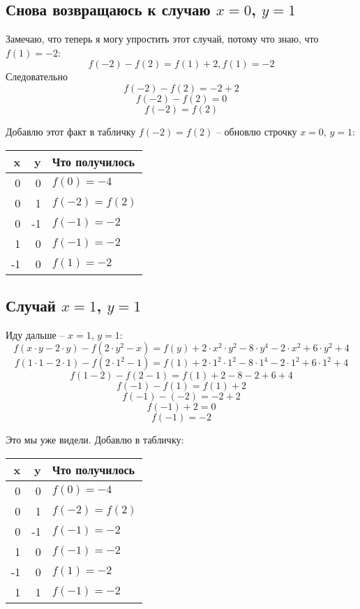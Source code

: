 \documentclass{article}
\begin{document}
\subsection{Снова возвращаюсь к случаю $x=0$, $y=1$}
Замечаю, что теперь я могу упростить этот случай, потому что знаю, что $f(1)=-2$:
$$f(-2)-f(2)=f(1)+2, f(1)=-2$$
Следовательно
$$f(-2)-f(2)=-2+2$$
$$f(-2)-f(2)=0$$
$$f(-2)=f(2)$$

\begin{samepage}
Добавлю этот факт в табличку {\boldmath\color{red}$f(-2)=f(2)$} -- обновлю строчку $x=0$, $y=1$:
\begin{center}
 \begin{tabular}{r r l} 
 \hline
 x & y & Что получилось        \\
 \hline
  0 &  0 & $f(0)=-4$           \\
  0 &  1 & $f(-2)=f(2)$        \\
  0 & -1 & $f(-1)=-2$          \\
  1 &  0 & $f(-1)=-2$          \\
 -1 &  0 & $f(1)=-2$ \\
 \hline
 \end{tabular}
\end{center}
\end{samepage}

\subsection{Случай $x=1$, $y=1$}
Иду дальше -- $x=1$, $y=1$:
$$f(x\cdot{}y-2\cdot{}y)-f(2\cdot{}y^2-x)=f(y)+2\cdot{}x^2\cdot{}y^2-8\cdot{}y^4-2\cdot{}x^2+6\cdot{}y^2+4$$
$$f(1\cdot{}1-2\cdot{}1)-f(2\cdot{}1^2-1)=f(1)+2\cdot{}1^2\cdot{}1^2-8\cdot{}1^4-2\cdot{}1^2+6\cdot{}1^2+4$$
$$f(1-2)-f(2-1)=f(1)+2-8-2+6+4$$
$$f(-1)-f(1)=f(1)+2$$
$$f(-1)-(-2)=-2+2$$
$$f(-1)+2=0$$
$$f(-1)=-2$$

\begin{samepage}
Это мы уже видели. Добавлю в табличку:
\begin{center}
 \begin{tabular}{r r l} 
 \hline
 x & y & Что получилось        \\
 \hline
  0 &  0 & $f(0)=-4$           \\
  0 &  1 & $f(-2)=f(2)$        \\
  0 & -1 & $f(-1)=-2$          \\
  1 &  0 & $f(-1)=-2$          \\
 -1 &  0 & $f(1)=-2$           \\
  1 &  1 & $f(-1)=-2$ \\
  \hline
 \end{tabular}
\end{center}
\end{samepage}
\end{document}
